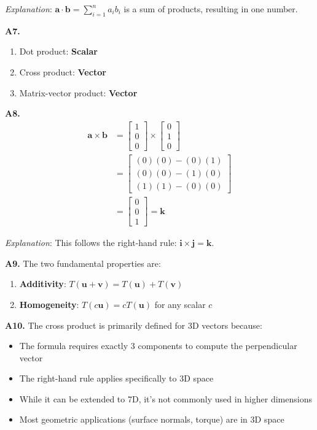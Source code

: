 \documentclass[12pt,a4paper]{article}
\theoremstyle{definition}
\begin{document}
\textit{Explanation}: $\mathbf{a} \cdot \mathbf{b} = \sum_{i=1}^{n} a_i b_i$ is a sum of products, resulting in one number.

\textbf{A7.}
\begin{enumerate}[label=(\alph*)]
\item Dot product: \textbf{Scalar}
\item Cross product: \textbf{Vector}
\item Matrix-vector product: \textbf{Vector}
\end{enumerate}

\textbf{A8.}
\begin{align}
\mathbf{a} \times \mathbf{b} &= \begin{bmatrix} 1 \\ 0 \\ 0 \end{bmatrix} \times \begin{bmatrix} 0 \\ 1 \\ 0 \end{bmatrix} \\
&= \begin{bmatrix}
(0)(0) - (0)(1) \\
(0)(0) - (1)(0) \\
(1)(1) - (0)(0)
\end{bmatrix} \\
&= \begin{bmatrix} 0 \\ 0 \\ 1 \end{bmatrix} = \mathbf{k}
\end{align}

\textit{Explanation}: This follows the right-hand rule: $\mathbf{i} \times \mathbf{j} = \mathbf{k}$.

\textbf{A9.} The two fundamental properties are:
\begin{enumerate}
\item \textbf{Additivity}: $T(\mathbf{u} + \mathbf{v}) = T(\mathbf{u}) + T(\mathbf{v})$
\item \textbf{Homogeneity}: $T(c\mathbf{u}) = cT(\mathbf{u})$ for any scalar $c$
\end{enumerate}

\textbf{A10.} The cross product is primarily defined for 3D vectors because:
\begin{itemize}
\item The formula requires exactly 3 components to compute the perpendicular vector
\item The right-hand rule applies specifically to 3D space
\item While it can be extended to 7D, it's not commonly used in higher dimensions
\item Most geometric applications (surface normals, torque) are in 3D space
\end{itemize}
\end{document}
